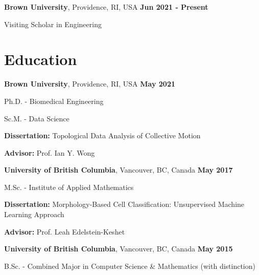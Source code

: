 \documentclass[margin,line]{res}
\newenvironment{list1}{
  \begin{list}{\ding{113}}{
      \setlength{\itemsep}{0in}
      \setlength{\parsep}{0in} \setlength{\parskip}{0in}
      \setlength{\topsep}{0in} \setlength{\partopsep}{0in}
      \setlength{\leftmargin}{0.17in}}}{\end{list}}
\begin{document}
\begin{resume}
{\bf Brown University}, Providence, RI, USA  \hfill {\bf Jun 2021 - Present}\\
\vspace*{-.2cm}
\begin{list1}
\item[] Visiting Scholar in Engineering
\end{list1}

\vspace*{.08cm}

\section{\sc Education}

{\bf Brown University}, Providence, RI, USA  \hfill {\bf May 2021}\\
\vspace*{-.2cm}
\begin{list1}
\setlength\itemsep{0.15em}
\item[] Ph.D. - Biomedical Engineering
\item[] Sc.M. - Data Science
\vspace*{.1cm}
\item[] {\bf Dissertation:} Topological Data Analysis of Collective Motion
\vspace*{.1cm}
\item[] {\bf Advisor:} Prof. Ian Y. Wong
\end{list1}
\vspace*{.12cm}

{\bf University of British Columbia}, Vancouver, BC, Canada  \hfill {\bf May 2017}\\
\vspace*{-.2cm}
\begin{list1}
\item[] M.Sc. - Institute of Applied Mathematics
\vspace*{.1cm}
\item[] {\bf Dissertation:} Morphology-Based Cell Classification: Unsupervised Machine Learning Approach
\vspace*{-0.3cm}
\item[] {\bf Advisor:} Prof. Leah Edelstein-Keshet
\end{list1}
\vspace*{.12cm}

{\bf University of British Columbia}, Vancouver, BC, Canada  \hfill {\bf May 2015}\\
\vspace*{-.2cm}
\begin{list1}
\item[] B.Sc. - Combined Major in Computer Science \& Mathematics (with distinction)
\end{list1}


\end{resume}
\end{document}
